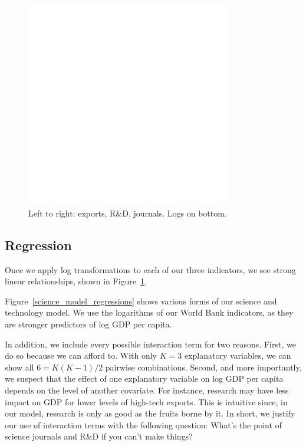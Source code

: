 \documentclass[11pt]{article}
\begin{document}
\begin{figure}[!ht]
  \centering
  \includegraphics[width=0.8\textwidth]{images/science_model_scatter}
  \caption{\label{science_model_scatter}Left to right: exports, R\&D, journals. Logs on bottom.}
\end{figure}

\subsection{Regression}

Once we apply log transformations to each of our three indicators, we see strong linear relationships, shown in Figure~\ref{science_model_scatter}.

Figure~\ref{science_model_regressions} shows various forms of our science and technology model. We use the logarithms of our World Bank indicators, as they are stronger predictors of log GDP per capita.

In addition, we include every possible interaction term for two reasons.
First, we do so because we can afford to. With only $K=3$ explanatory variables, we can show all $6 = K(K-1)/2$ pairwise combinations. 
Second, and more importantly, we suspect that the effect of one explanatory variable on log GDP per capita depends on the level of another covariate. For instance, research may have less impact on GDP for lower levels of high-tech exports. This is intuitive since, in our model, research is only as good as the fruits borne by it. In short, we justify our use of interaction terms with the following question: What's the point of science journals and R\&D if you can't make things?
\end{document}

